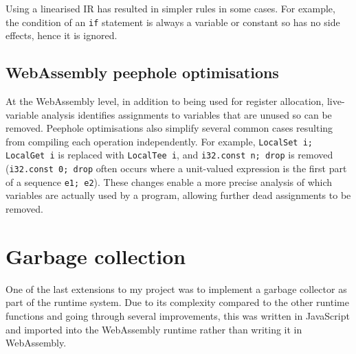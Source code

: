 Using a linearised IR has resulted in simpler rules in some cases. For example, the condition of an \verb|if| statement is always a variable or constant so has no side effects, hence it is ignored.

%


\subsection{WebAssembly peephole optimisations}

At the WebAssembly level, in addition to being used for register allocation, live-variable analysis identifies assignments to variables that are unused so can be removed. Peephole optimisations also simplify several common cases resulting from compiling each operation independently. For example, \verb|LocalSet i; LocalGet i| is replaced with \verb|LocalTee i|, and \verb|i32.const n; drop| is removed (\verb|i32.const 0; drop| often occurs where a unit-valued expression is the first part of a sequence \verb|e1; e2|). These changes enable a more precise analysis of which variables are actually used by a program, allowing further dead assignments to be removed.

\section{Garbage collection}
One of the last extensions to my project was to implement a garbage collector as part of the runtime system. Due to its complexity compared to the other runtime functions and going through several improvements, this was written in JavaScript and imported into the WebAssembly runtime rather than writing it in WebAssembly. %

